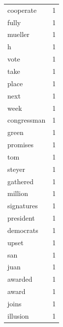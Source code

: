 \begin{tabular}{lr}
cooperate & 1 \\
fully & 1 \\
mueller & 1 \\
h & 1 \\
vote & 1 \\
take & 1 \\
place & 1 \\
next & 1 \\
week & 1 \\
congressman & 1 \\
green & 1 \\
promises & 1 \\
tom & 1 \\
steyer & 1 \\
gathered & 1 \\
million & 1 \\
signatures & 1 \\
president & 1 \\
democrats & 1 \\
upset & 1 \\
san & 1 \\
juan & 1 \\
awarded & 1 \\
award & 1 \\
joins & 1 \\
illusion & 1 \\
\bottomrule
\end{tabular}
